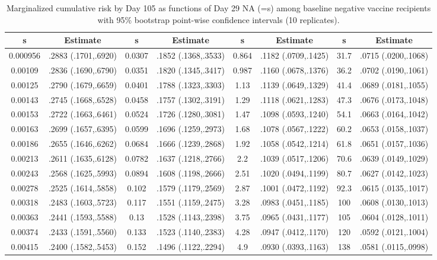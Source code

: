 \begin{longtable}{cccccccc}
\caption{Marginalized cumulative risk by Day 105 as functions of Day 29 NA (=s) among baseline negative vaccine recipients with 95\% bootstrap point-wise confidence intervals (10 replicates).} \\ 
   \hline  s& Estimate& s& Estimate& s& Estimate& s& Estimate\\ 
\hline
0.000956 & .2883 (.1701,.6920) & 0.0307 & .1852 (.1368,.3533) & 0.864 & .1182 (.0709,.1425) & 31.7 & .0715 (.0200,.1068) \\ 
  0.00109 & .2836 (.1690,.6790) & 0.0351 & .1820 (.1345,.3417) & 0.987 & .1160 (.0678,.1376) & 36.2 & .0702 (.0190,.1061) \\ 
  0.00125 & .2790 (.1679,.6659) & 0.0401 & .1788 (.1323,.3303) & 1.13 & .1139 (.0649,.1329) & 41.4 & .0689 (.0181,.1055) \\ 
  0.00143 & .2745 (.1668,.6528) & 0.0458 & .1757 (.1302,.3191) & 1.29 & .1118 (.0621,.1283) & 47.3 & .0676 (.0173,.1048) \\ 
  0.00153 & .2722 (.1663,.6461) & 0.0524 & .1726 (.1280,.3081) & 1.47 & .1098 (.0593,.1240) & 54.1 & .0663 (.0164,.1042) \\ 
  0.00163 & .2699 (.1657,.6395) & 0.0599 & .1696 (.1259,.2973) & 1.68 & .1078 (.0567,.1222) & 60.2 & .0653 (.0158,.1037) \\ 
  0.00186 & .2655 (.1646,.6262) & 0.0684 & .1666 (.1239,.2868) & 1.92 & .1058 (.0542,.1214) & 61.8 & .0651 (.0157,.1036) \\ 
  0.00213 & .2611 (.1635,.6128) & 0.0782 & .1637 (.1218,.2766) & 2.2 & .1039 (.0517,.1206) & 70.6 & .0639 (.0149,.1029) \\ 
  0.00243 & .2568 (.1625,.5993) & 0.0894 & .1608 (.1198,.2666) & 2.51 & .1020 (.0494,.1199) & 80.7 & .0627 (.0142,.1023) \\ 
  0.00278 & .2525 (.1614,.5858) & 0.102 & .1579 (.1179,.2569) & 2.87 & .1001 (.0472,.1192) & 92.3 & .0615 (.0135,.1017) \\ 
  0.00318 & .2483 (.1603,.5723) & 0.117 & .1551 (.1159,.2475) & 3.28 & .0983 (.0451,.1185) & 100 & .0608 (.0130,.1013) \\ 
  0.00363 & .2441 (.1593,.5588) & 0.13 & .1528 (.1143,.2398) & 3.75 & .0965 (.0431,.1177) & 105 & .0604 (.0128,.1011) \\ 
  0.00374 & .2433 (.1591,.5560) & 0.133 & .1523 (.1140,.2383) & 4.28 & .0947 (.0412,.1170) & 120 & .0592 (.0121,.1004) \\ 
  0.00415 & .2400 (.1582,.5453) & 0.152 & .1496 (.1122,.2294) & 4.9 & .0930 (.0393,.1163) & 138 & .0581 (.0115,.0998) \\ 

\end{longtable}

